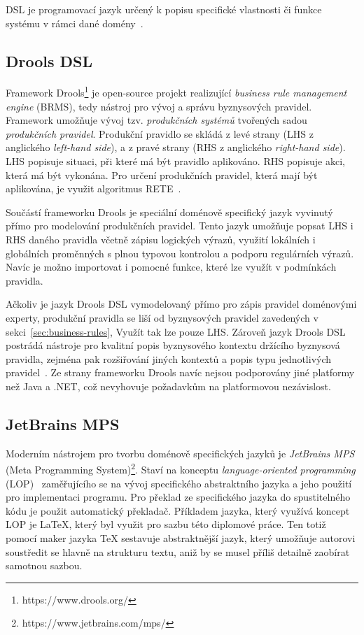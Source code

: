 \begin{definition}
    \gls{DSL} je programovací jazyk určený k popisu specifické vlastnosti či funkce systému v
    rámci dané domény~\cite{fowler2010domain}.
\end{definition}

\subsection{Drools DSL}\label{sec:drools}

Framework Drools\footnote{https://www.drools.org/} je open-source projekt realizující
\textit{business rule management engine} (\gls{BRMS}), tedy nástroj pro vývoj a správu byznysových
pravidel. Framework umožňuje vývoj tzv. \textit{produkčních systémů} tvořených sadou \textit{produkčních pravidel}.
Produkční pravidlo se skládá z levé strany (\gls{LHS} z anglického \textit{left-hand side}),
a z pravé strany (\gls{RHS} z anglického \textit{right-hand side}).
\gls{LHS} popisuje situaci, při které má být pravidlo aplikováno. \gls{RHS} popisuje akci,
která má být vykonána. Pro určení produkčních pravidel, která mají být aplikována, je využit
algoritmus RETE~\cite{forgy1988rete}.

Součástí frameworku Drools je speciální doménově specifický jazyk vyvinutý přímo
pro modelování produkčních pravidel. Tento jazyk umožňuje popsat \gls{LHS} i \gls{RHS}
daného pravidla včetně zápisu logických výrazů, využití lokálních i globálních proměnných
s plnou typovou kontrolou a podporu regulárních výrazů. Navíc je možno importovat i pomocné funkce, které lze
využít v podmínkách pravidla.

Ačkoliv je jazyk Drools \gls{DSL} vymodelovaný přímo pro zápis pravidel doménovými experty,
produkční pravidla se liší od byznysových pravidel zavedených v sekci~\ref{sec:business-rules},
Využít tak lze pouze \gls{LHS}. Zároveň jazyk Drools \gls{DSL} postrádá
nástroje pro kvalitní popis byznysového kontextu držícího byznysová pravidla,
zejména pak rozšiřování jiných kontextů a popis typu jednotlivých pravidel~\cite{cemus2017automated}.
Ze strany frameworku Drools navíc nejsou podporovány jiné platformy než Java a .NET, což nevyhovuje
požadavkům na platformovou nezávislost.

\subsection{JetBrains MPS}

Moderním nástrojem pro tvorbu doménově specifických jazyků
je \textit{JetBrains MPS} (Meta Programming System)\footnote{https://www.jetbrains.com/mps/}.
Staví na konceptu \textit{language-oriented programming} (\gls{LOP})~\cite{ward1994language} zaměřujícího
se na vývoj specifického abstraktního jazyka a jeho použití pro implementaci programu. Pro překlad ze specifického
jazyka do spustitelného kódu je použit automatický překladač. Příkladem jazyka, který využívá koncept \gls{LOP}
je \LaTeX\xspace, který byl využit pro sazbu této diplomové práce. Ten totiž pomocí maker jazyka \TeX\xspace
sestavuje abstraktnější jazyk, který umožňuje autorovi soustředit se hlavně na strukturu textu, aniž by
se musel příliš detailně zaobírat samotnou sazbou.

